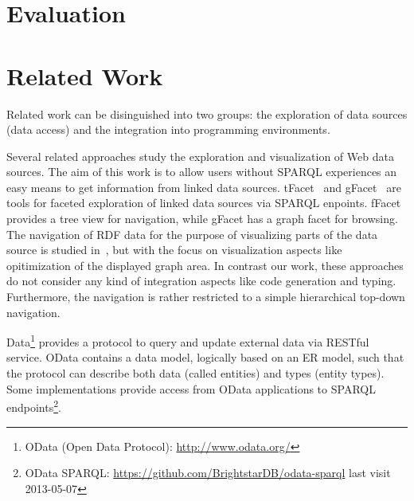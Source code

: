 \documentclass{llncs} %
\begin{document}
\section{Evaluation}
\label{sec:eval}


 
\section{Related Work}
\label{sec:rw}

Related work can be disinguished into two groups: the exploration of data sources (data access)
and the integration into programming environments.

Several related approaches study the exploration and visualization of Web data sources. 
The aim of this work is to allow users without SPARQL experiences an easy means to
get information from linked data sources.
tFacet~\cite{tFacet} and gFacet~\cite{heim2008gfacet} are tools for faceted exploration of linked data sources
via SPARQL enpoints. fFacet provides a tree view for navigation, while gFacet has a graph facet for browsing.
The navigation of RDF data for the purpose of visualizing parts of the data source is studied in~\cite{DBLP:conf/iv/DokulilK08},
but with the focus on visualization aspects like opitimization of the displayed graph area.
In contrast our work, these approaches do not consider any kind of integration aspects like code generation and typing.
Furthermore, the navigation is rather restricted to a simple hierarchical top-down navigation.

Data\footnote{OData (Open Data Protocol): \url{http://www.odata.org/}}  provides a protocol to query and update external data via RESTful service.
OData contains a data model, logically based on an ER model, such that the protocol can describe both data (called entities) and types (entity types).
Some implementations provide access from OData applications to SPARQL endpoints\footnote{OData SPARQL: \url{https://github.com/BrightstarDB/odata-sparql} last visit 2013-05-07}.



 
\end{document}
